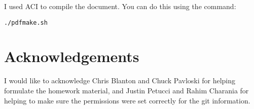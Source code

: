 \documentclass{article}
\begin{document}
\begin{spacing}{1.1}
I used ACI to compile the document.  You can do this using the command:
\begin{verbatim}
./pdfmake.sh
\end{verbatim}

\section{Acknowledgements}

I would like to acknowledge Chris Blanton and Chuck Pavloski for helping formulate the homework material, and Justin Petucci and Rahim Charania for helping to make sure the permissions were set correctly for the git information.



\end{spacing}


\end{document}
